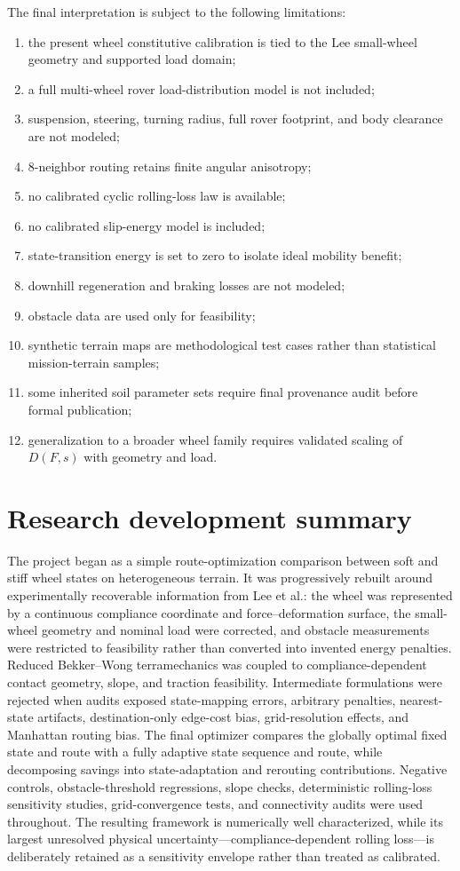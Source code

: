 \documentclass[11pt]{article}
\begin{document}
The final interpretation is subject to the following limitations:
\begin{enumerate}[label=(\arabic*)]
\item the present wheel constitutive calibration is tied to the Lee small-wheel geometry and supported load domain;
\item a full multi-wheel rover load-distribution model is not included;
\item suspension, steering, turning radius, full rover footprint, and body clearance are not modeled;
\item 8-neighbor routing retains finite angular anisotropy;
\item no calibrated cyclic rolling-loss law is available;
\item no calibrated slip-energy model is included;
\item state-transition energy is set to zero to isolate ideal mobility benefit;
\item downhill regeneration and braking losses are not modeled;
\item obstacle data are used only for feasibility;
\item synthetic terrain maps are methodological test cases rather than statistical mission-terrain samples;
\item some inherited soil parameter sets require final provenance audit before formal publication;
\item generalization to a broader wheel family requires validated scaling of $D(F,s)$ with geometry and load.
\end{enumerate}

\section{Research development summary}

The project began as a simple route-optimization comparison between soft and stiff wheel states on heterogeneous terrain. It was progressively rebuilt around experimentally recoverable information from Lee et al.: the wheel was represented by a continuous compliance coordinate and force--deformation surface, the small-wheel geometry and nominal load were corrected, and obstacle measurements were restricted to feasibility rather than converted into invented energy penalties. Reduced Bekker--Wong terramechanics was coupled to compliance-dependent contact geometry, slope, and traction feasibility. Intermediate formulations were rejected when audits exposed state-mapping errors, arbitrary penalties, nearest-state artifacts, destination-only edge-cost bias, grid-resolution effects, and Manhattan routing bias. The final optimizer compares the globally optimal fixed state and route with a fully adaptive state sequence and route, while decomposing savings into state-adaptation and rerouting contributions. Negative controls, obstacle-threshold regressions, slope checks, deterministic rolling-loss sensitivity studies, grid-convergence tests, and connectivity audits were used throughout. The resulting framework is numerically well characterized, while its largest unresolved physical uncertainty---compliance-dependent rolling loss---is deliberately retained as a sensitivity envelope rather than treated as calibrated.
\end{document}
